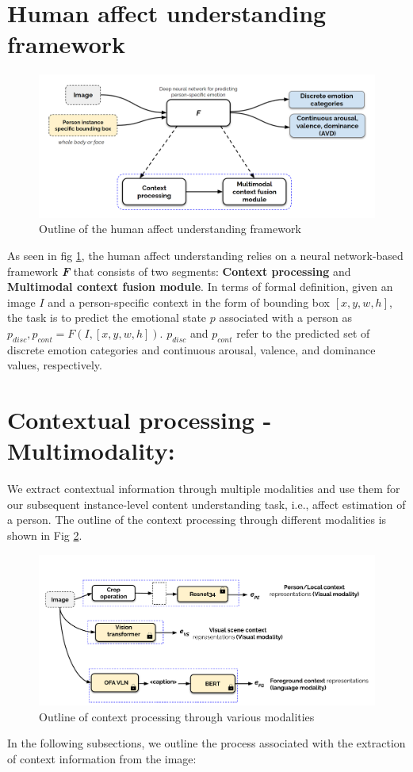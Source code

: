 \section{Human affect understanding framework}
\begin{figure}[h!]
    \centering
    \includegraphics[width=\textwidth]{figures/human_affect_understanding.png}
    \caption{Outline of the human affect understanding framework }
    \label{human affect understanding}
\end{figure}
As seen in fig \ref{human affect understanding}, the human affect understanding relies on a neural network-based framework \textbf{\textit{F}} that consists of two segments: \textbf{Context processing} and \textbf{Multimodal context fusion module}. In terms of formal definition, given an image $I$ and a person-specific context in the form of bounding box $[x,y,w,h]$, the task is to predict the emotional state $p$ associated with a person as $p_{disc}, p_{cont} = F(I,[x,y,w,h])$. $p_{disc}$ and $p_{cont}$ refer to the predicted set of discrete emotion categories and continuous arousal, valence, and dominance values, respectively.
\section{Contextual processing - Multimodality:}
We extract contextual information through multiple modalities and use them for our subsequent instance-level content understanding task, i.e., affect estimation of a person. The outline of the context processing through different modalities is shown in Fig \ref{context_extraction}.
\begin{figure}
    \centering
    \includegraphics[width=\textwidth]{figures/context_extraction.pdf}
    \caption{Outline of context processing through various modalities}
    \label{context_extraction}
\end{figure}
In the following subsections, we outline the process associated with the extraction of context information from the image:
